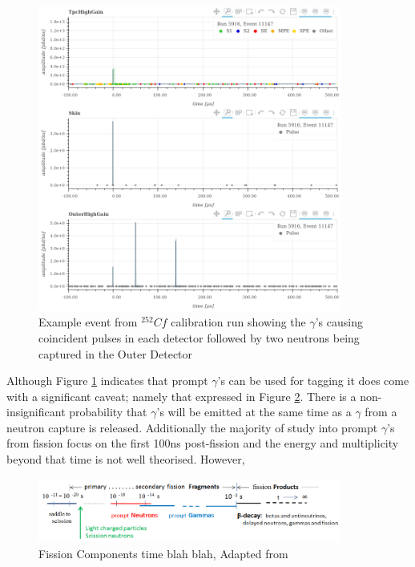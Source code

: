 \begin{figure}[!htbp]
\includegraphics[width=10cm]{Figures/NeutronCaptureTime/cf252_eventviewer_5916.png}
\centering
\caption{Example event from ${}^{252}{Cf}$ calibration run showing the $\gamma$'s causing coincident pulses in each detector followed by two neutrons being captured in the Outer Detector}
\label{fig:cf252_event_viewer}
\end{figure}

\par
Although Figure \ref{fig:cf252_event_viewer} indicates that prompt $\gamma$'s can be used for tagging it does come with a significant caveat; namely that expressed in Figure \ref{fig:fission_fragments_time}.
There is a non-insignificant probability that $\gamma$'s will be emitted at the same time as a $\gamma$ from a neutron capture is released.
Additionally the majority of study into prompt $\gamma$'s from fission focus on the first 100ns post-fission and the energy and multiplicity beyond that time is not well theorised. 
However, 


\begin{figure}[!htbp]
\includegraphics[width=10cm]{Figures/NeutronCaptureTime/fission_fragment_times.png}
\centering
\caption{Fission Components time blah blah, Adapted from \cite{cf252_fission_ref}}
\label{fig:fission_fragments_time}
\end{figure}



